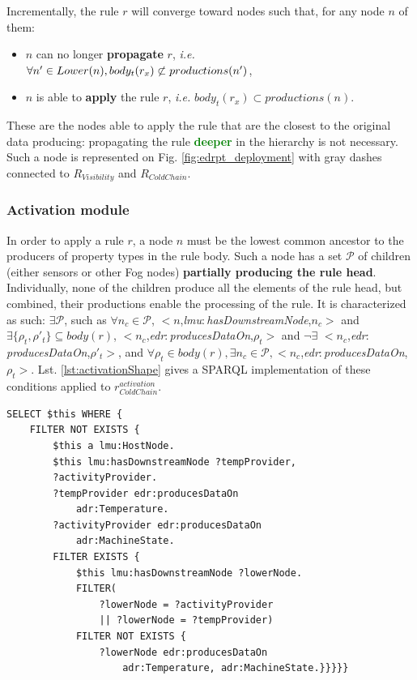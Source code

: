 \documentclass{iosart2c}
\newcommand{\added}[1]{\textcolor{green}{\textbf{#1}}}
\newcommand{\namespace}[1]{\textit{#1$:$}}
\newcommand{\concept}[2]{\namespace{#1}\-\textit{#2}}
\newcommand{\triplet}[3]{$<$#1,\textit{#2},#3$>$}
\begin{document}
Incrementally, the rule $r$ will converge toward nodes such that, for any node $n$ of them:
\begin{itemize}
	\item $n$ can no longer \textbf{propagate} $r$, \textit{i.e.} $\forall n'\in Lo\-wer(n), body_t(r_{x})\not\subset pro\-du\-ctions(n')$,
	\item $n$ is able to \textbf{apply} the rule $r$, \textit{i.e.} $body_t(r_{x})\subset productions(n)$.
\end{itemize} 
These are the nodes able to apply the rule that are the closest to the original data producing: propagating the rule \added{deeper} in the hierarchy is not necessary.
Such a node is represented on Fig. \ref{fig:edrpt_deployment} with gray dashes connected to $R_{Visibility}$ and $R_{ColdChain}$. 

\subsubsection{Activation module}

In order to apply a rule $r$, a node $n$ must be the lowest common ancestor to the producers of property types in the rule body. 
Such a node has a set $\mathcal{P}$ of children (either sensors or other Fog nodes) \textbf{partially producing the rule head}. 
Individually, none of the children produce all the elements of the rule head, but combined, their productions enable the processing of the rule. 
It is characterized as such: $\exists \mathcal{P}$, such as $\forall n_c\in \mathcal{P}$, \triplet{$n$}{\concept{lmu}{has\-Down\-stream\-Node}}{$n_c$} and $\exists \{\rho_t, \rho'_t\} \subseteq body(r)$, \triplet{$n_c$}{\concept{edr}{produces\-Data\-On}}{$\rho_t$} and $\neg\exists$ \triplet{$n_c$}{\concept{edr}{produces\-Data\-On}}{$\rho'_t$}, and $\forall \rho_t \in body(r), \exists n_c\in \mathcal{P},$\triplet{$n_c$}{\concept{edr}{produces\-Data\-On}}{$\rho_t$}.
Lst. \ref{lst:activationShape} gives a SPARQL implementation of these conditions applied to $r_{ColdChain}^{activation}$. 

\begin{lstlisting}[float, caption=$r_{ColdChain}^{activation}$ shape, label=lst:activationShape]
SELECT $this WHERE {
	FILTER NOT EXISTS {
		$this a lmu:HostNode.
		$this lmu:hasDownstreamNode ?tempProvider,
		?activityProvider.
		?tempProvider edr:producesDataOn 
			adr:Temperature.
		?activityProvider edr:producesDataOn 
			adr:MachineState.
		FILTER EXISTS {
			$this lmu:hasDownstreamNode ?lowerNode.
			FILTER(
				?lowerNode = ?activityProvider 
				|| ?lowerNode = ?tempProvider)
			FILTER NOT EXISTS {
				?lowerNode edr:producesDataOn 
					adr:Temperature, adr:MachineState.}}}}}
\end{lstlisting}
\end{document}
